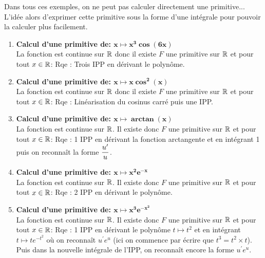 \documentclass[a4paper, 11pt,reqno]{article}
\begin{document}
\begin{correction}
	Dans tous ces exemples, on ne peut pas calculer directement une primitive... L'id\'ee alors d'exprimer cette primitive sous la forme d'une int\'egrale pour pouvoir la calculer plus facilement.
	\begin{enumerate}
		\item \textbf{Calcul d'une primitive de: $\mathbf{x\mapsto x^3\cos{(6x)}}$}\\
		      \noindent La fonction est continue sur $\mathbb{R}$ donc il existe $F$ une primitive sur $\mathbb{R}$ et pour tout $x\in\mathbb{R}$:  
        Rqe :  Trois IPP en d\'erivant le polyn\^{o}me.
		\item \textbf{Calcul d'une primitive de: $\mathbf{x\mapsto x\cos^2{(x)}}$}\\
		      \noindent La fonction est continue sur $\mathbb{R}$ donc il existe $F$ une primitive sur $\mathbb{R}$ et pour tout $x\in\mathbb{R}$:  
        Rqe : Lin\'earisation du cosinus carr\'e puis une IPP.
		\item \textbf{Calcul d'une primitive de: $\mathbf{x\mapsto \arctan{(x)} }$}\\
		      \noindent La fonction est continue sur $\mathbb{R}$. Il existe donc $F$ une primitive sur $\mathbb{R}$ et pour tout $x\in\mathbb{R}$:
        Rqe : 1 IPP en d\'erivant la fonction arctangente et en int\'egrant 1 puis on reconna\^{i}t la forme $\displaystyle\frac{u^{\prime}}{u}$.
		\item \textbf{Calcul d'une primitive de: $\mathbf{x\mapsto x^2 e^{-x}}$}\\
		      \noindent La fonction est continue sur $\mathbb{R}$. Il existe donc $F$ une primitive sur $\mathbb{R}$ et pour tout $x\in\mathbb{R}$:
        Rqe : 2 IPP en d\'erivant le polyn\^{o}me.
		\item \textbf{Calcul d'une primitive de: $\mathbf{x\mapsto x^3e^{-x^2}}$}\\
		      \noindent La fonction est continue sur $\mathbb{R}$. Il existe donc $F$ une primitive sur $\mathbb{R}$ et pour tout $x\in\mathbb{R}$:
        Rqe : 1 IPP en d\'erivant le polyn\^{o}me $t\mapsto t^2$ et en int\'egrant $t\mapsto te^{-t^2}$ o\`{u} on reconna\^{i}t $u^{\prime}e^{u}$ (ici on commence par \'ecrire que $t^3=t^2\times t$). Puis dans la nouvelle int\'egrale de l'IPP, on reconna\^{i}t encore la forme $u^{\prime}e^{u}$.
	\end{enumerate}
\end{correction}
\end{document}
